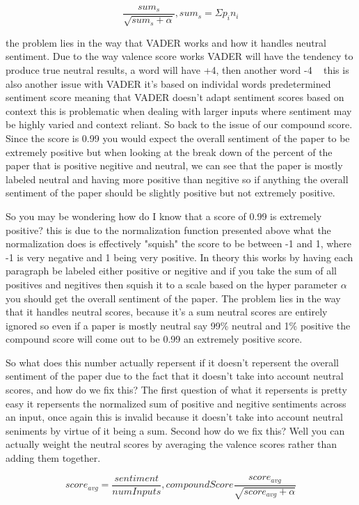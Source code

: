 \documentclass[12pt]{article}
\begin{document}
$$
\frac{sum_s}{\sqrt{sum_s+\alpha}}, sum_s = \Sigma{}p_i n_i
$$

the problem lies in the way that VADER works and how it handles neutral
sentiment. Due to the way valence score works VADER will have the tendency
to produce true neutral results, a word will have +4, then another word -4 ~\cite{vadercode}
this is also another issue with VADER it's based on individal words predetermined
sentiment score meaning that VADER doesn't adapt sentiment scores based on context
this is problematic when dealing with larger inputs where sentiment may be highly varied
and context reliant. So back to the issue of our compound score.
Since the score is 0.99 you would expect the overall sentiment of the paper to be
extremely positive but when looking at the break down of the percent of the paper
that is positive negitive and neutral, we can see that the paper is mostly
labeled neutral and having more positive than negitive so if anything the overall
sentiment of the paper should be slightly positive but not extremely positive.

So you may be wondering how do I know that a score of 0.99 is extremely positive?
this is due to the normalization function presented above what the normalization
does is effectively "squish" the score to be between -1 and 1, where -1 is very 
negative and 1 being very positive. In theory this works by having each paragraph
be labeled either positive or negitive and if you take the sum of all positives and
negitives then squish it to a scale based on the hyper parameter $\alpha$ you
should get the overall sentiment of the paper. The problem lies in the way that it
handles neutral scores, because it's a sum neutral scores are entirely ignored
so even if a paper is mostly neutral say 99\% neutral and 1\% positive the compound
score will come out to be 0.99 an extremely positive score. 

So what does this number actually repersent
if it doesn't repersent the overall sentiment of the paper due to the fact
that it doesn't take into account
neutral scores, and how do we fix this? The first question of what it repersents
is pretty easy it repersents the normalized sum of positive and negitive sentiments 
across an input, once again this is invalid because it doesn't take into account
neutral seniments by virtue of it being a sum. Second how do we fix this? Well
you can actually weight the neutral scores by averaging the valence scores rather
than adding them together.

$$
score_{avg} = \frac{sentiment}{numInputs}, 
compoundScore\frac{score_{avg}}{\sqrt{score_{avg} + \alpha}}
$$
\end{document}
